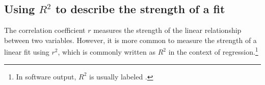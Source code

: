 







\subsection{Using $R^2$ to describe the strength of a fit}
\label{RSquaredLinearRegression}


The correlation coefficient $r$ measures the strength of the linear relationship between two variables. However, it is more common to measure the strength of a linear fit using $r^2$, which is commonly written as $R^2$ in the context of regression.\footnote{In software output, $R^2$ is usually labeled .} 

